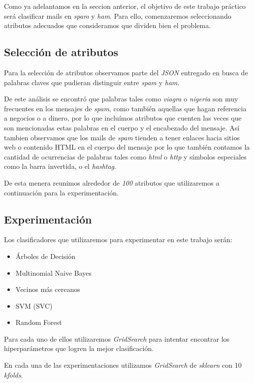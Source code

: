 Como ya adelantamos en la seccion anterior, el objetivo de este trabajo práctico será clasificar mails en \textit{spam} y \textit{ham}. Para ello, comenzaremos seleccionando atributos adecuados que consideramos que dividen bien el problema.

\subsection{Selección de atributos}

Para la selección de atributos observamos parte del \textit{JSON} entregado en busca de palabras claves que pudieran distinguir entre \textit{spam} y \textit{ham}.

De este análisis se encontró que palabras tales como \textit{viagra} o \textit{nigeria} son muy frecuentes en los mensajes de \textit{spam}, como también aquellas que hagan referencia a negocios o a dinero, por lo que incluímos atributos que cuenten las veces que son mencionadas estas palabras en el cuerpo y el encabezado del mensaje. Así tambien observamos que los mails de \textit{spam} tienden a tener enlaces hacia sitios web o contenido HTML en el cuerpo del mensaje por lo que también contamos la cantidad de ocurrencias de palabras tales como \textit{html} o \textit{http} y símbolos especiales como la barra invertida, o el \textit{hashtag}.

De esta menera reunimos alrededor de \textit{100} atributos que utilizaremos a continuación para la experimentación.

\subsection{Experimentación}

Los clasificadores que utilizaremos para experimentar en este trabajo serán: 

\begin{itemize}
\item	Árboles de Decisión
\item	Multinomial Naive Bayes 
\item	Vecinos más cercanos
\item	SVM (SVC)
\item	Random Forest
\end{itemize}

Para cada uno de ellos utilizaremos \textit{GridSearch} para intentar encontrar los hiperparámetros que logren la mejor clasificación.

En cada una de las experimentaciones utilizamos \textit{GridSearch} de \textit{sklearn} con 10 \textit{kfolds}.

